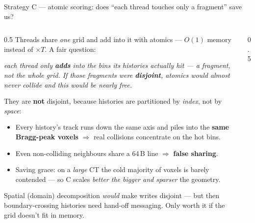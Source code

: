 \documentclass[aspectratio=169,10pt]{beamer}
\begin{document}
\begin{frame}{Strategy C — atomic scoring: does ``each thread touches only a fragment'' save us?}
  \begin{columns}[T]
    \begin{column}{0.5\textwidth}
      \small
      Threads share \emph{one} grid and add into it with atomics — $O(1)$
      memory instead of $\times T$. A fair question:

      \smallskip
      \textit{each thread only \textbf{adds} into the bins its histories
      actually hit — a fragment, not the whole grid. If those fragments were
      \textbf{disjoint}, atomics would almost never collide and this would be
      nearly free.}
      \medskip

      They are \textbf{not} disjoint, because histories are partitioned by
      \emph{index}, not by \emph{space}:
      \begin{itemize}\scriptsize\itemsep1pt
        \item Every history's track runs down the same axis and piles into the
              \textbf{same Bragg-peak voxels} $\Rightarrow$ real collisions
              concentrate on the hot bins.
        \item Even non-colliding neighbours share a 64\,B line $\Rightarrow$
              \textbf{false sharing}.
        \item \textcolor{oshGreen}{Saving grace:} on a \emph{large} CT the cold
              majority of voxels is barely contended — so C scales \emph{better
              the bigger and sparser} the geometry.
      \end{itemize}
      \footnotesize\color{oshGrey}
      Spatial (domain) decomposition \emph{would} make writes disjoint — but
      then boundary-crossing histories need hand-off messaging. Only worth it
      if the grid doesn't fit in memory.
    \end{column}
    \begin{column}{0.5\textwidth}
      \centering
\end{column}
\end{columns}
\end{frame}
\end{document}

